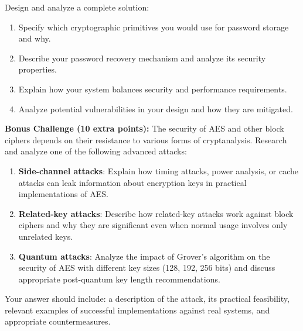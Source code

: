 \documentclass[10pt,a4paper,american]{article}
\begin{document}
\begin{enumerate}
	      Design and analyze a complete solution:
	      \begin{enumerate}
		      \item Specify which cryptographic primitives you would use for password storage and why.
		      \item Describe your password recovery mechanism and analyze its security properties.
		      \item Explain how your system balances security and performance requirements.
		      \item Analyze potential vulnerabilities in your design and how they are mitigated.
	      \end{enumerate}
\end{enumerate}

\begin{tcolorbox}[colframe=EarthBrown!30!white,colback=EarthBrown!5!white]
	\textbf{Bonus Challenge (10 extra points):} The security of AES and other block ciphers depends on their resistance to various forms of cryptanalysis. Research and analyze one of the following advanced attacks:

	\begin{enumerate}
		\item \textbf{Side-channel attacks}: Explain how timing attacks, power analysis, or cache attacks can leak information about encryption keys in practical implementations of AES.
		\item \textbf{Related-key attacks}: Describe how related-key attacks work against block ciphers and why they are significant even when normal usage involves only unrelated keys.
		\item \textbf{Quantum attacks}: Analyze the impact of Grover's algorithm on the security of AES with different key sizes (128, 192, 256 bits) and discuss appropriate post-quantum key length recommendations.
	\end{enumerate}

	Your answer should include: a description of the attack, its practical feasibility, relevant examples of successful implementations against real systems, and appropriate countermeasures.
\end{tcolorbox}
\end{document}
